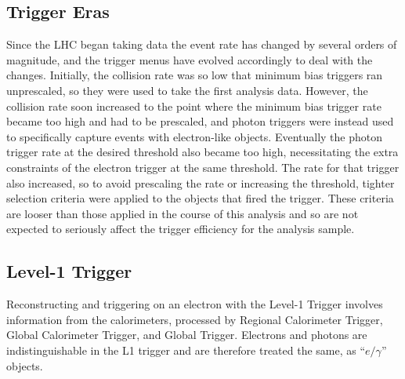 \subsection{Trigger Eras}
\label{evSel:triggerEras}
Since the LHC began taking data the event rate has changed by several orders of magnitude,  
and the trigger menus have evolved accordingly to deal with the changes.  
Initially, the collision rate was so low that minimum bias triggers ran unprescaled, 
so they were used to take the first analysis data.  
However, the collision rate soon increased to the point where the minimum bias trigger rate became too high
and had to be prescaled, and photon triggers were instead used %
to specifically capture events with electron-like objects.  %
Eventually the photon trigger rate at the desired threshold also became too high,
necessitating the extra constraints of the electron trigger at the same threshold.  
The rate for that trigger also increased, so to avoid prescaling the rate or increasing the threshold,
tighter selection criteria were applied to the objects that fired the trigger.  
These criteria are looser than those applied in the course of this analysis and so are not expected
to seriously affect the trigger efficiency for the analysis sample.  



\subsection{Level-1 Trigger}
\label{evSel:L1}
Reconstructing and triggering on an electron with the Level-1 Trigger 
involves information from the calorimeters, processed by 
Regional Calorimeter Trigger, Global Calorimeter Trigger, and 
Global Trigger.  
Electrons and photons are indistinguishable in the L1 trigger and are therefore 
treated the same, as ``$e/\gamma$'' objects.  

